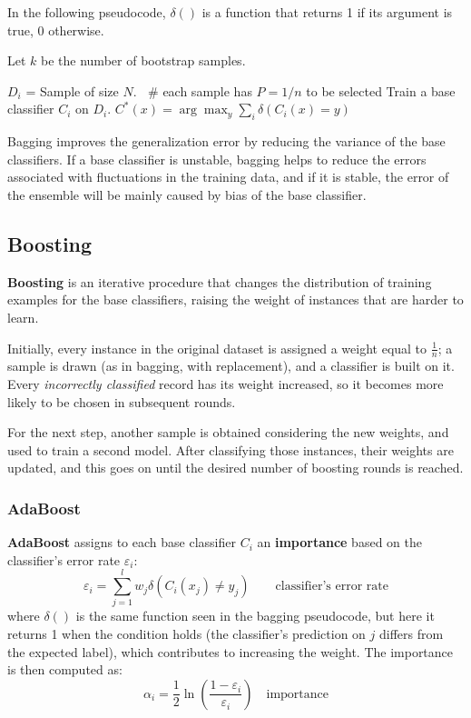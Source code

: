 In the following pseudocode, $\delta()$ is a function that returns 1 if its argument is true, 0 otherwise.
\begin{algorithm}[H]
\caption{Bagging algorithm.}
\begin{algorithmic}[1]
    \State Let $k$ be the number of bootstrap samples.

        \State $D_i$ = Sample of size $N.\;\;$ $\#$ each sample has $P= 1/n$ to be selected
        \State Train a base classifier $C_i$ on $D_i$.
    \EndFor
    \State $C^*(x) = \arg\max_y \sum_i \delta(C_i(x) = y)\;\;$ 
\end{algorithmic}
\end{algorithm} 
Bagging improves the generalization error by reducing the variance of the base classifiers. If a base classifier is unstable, bagging helps to reduce the errors associated with fluctuations in the training data, and if it is stable, the error of the ensemble will be mainly caused by bias of the base classifier.

\subsection{Boosting}
\textbf{Boosting} is an iterative procedure that changes the distribution of training examples for the base classifiers, raising the weight of instances that are harder to learn.

Initially, every instance in the original dataset is assigned a weight equal to $\frac{1}{n}$; a sample is drawn (as in bagging, with replacement), and a classifier is built on it. Every \textit{incorrectly classified} record has its weight increased, so it becomes more likely to be chosen in subsequent rounds.

For the next step, another sample is obtained considering the new weights, and used to train a second model. After classifying those instances, their weights are updated, and this goes on until the desired number of boosting rounds is reached.

\subsubsection{AdaBoost}
\textbf{AdaBoost} assigns to each base classifier $C_i$ an \textbf{importance} based on the classifier's error rate $\varepsilon_i$:
\begin{equation}
    \varepsilon_i = \sum_{j=1}^l w_j \delta(C_i(x_j) \neq y_j) \qquad \text{classifier's error rate} \label{AdaErrorRate}
\end{equation}
where $\delta()$ is the same function seen in the bagging pseudocode, but here it returns 1 when the condition holds (the classifier's prediction on $j$ differs from the expected label), which contributes to increasing the weight. The importance is then computed as:
\begin{equation}
    \alpha_i = \dfrac{1}{2} \ln \left(\dfrac{1-\varepsilon_i}{\varepsilon_i}\right) \quad\text{importance}\label{AdaImportance}
\end{equation}

